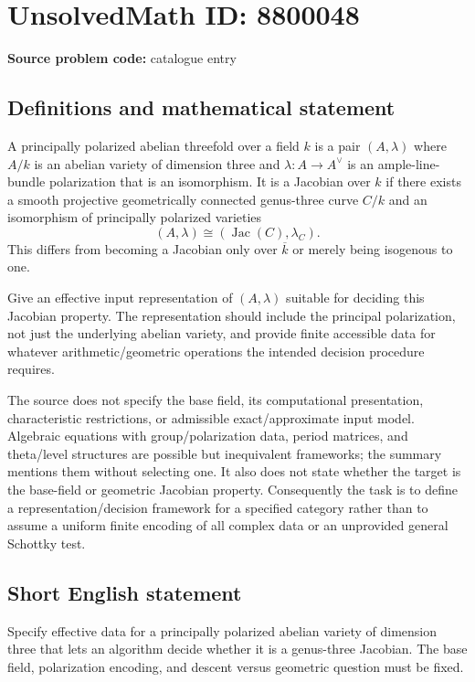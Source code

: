 \documentclass[11pt]{article}
\begin{document}
\section*{UnsolvedMath ID: 8800048}
\textbf{Source problem code:} catalogue entry
\subsection{Definitions and mathematical statement}
A principally polarized abelian threefold over a field $k$ is a pair $(A,\lambda)$ where $A/k$ is an abelian variety of dimension three and $\lambda:A\to A^\vee$ is an ample-line-bundle polarization that is an isomorphism. It is a Jacobian over $k$ if there exists a smooth projective geometrically connected genus-three curve $C/k$ and an isomorphism of principally polarized varieties
\[
(A,\lambda)\cong(\operatorname{Jac}(C),\lambda_C).
\]
This differs from becoming a Jacobian only over $\overline k$ or merely being isogenous to one.

Give an effective input representation of $(A,\lambda)$ suitable for deciding this Jacobian property. The representation should include the principal polarization, not just the underlying abelian variety, and provide finite accessible data for whatever arithmetic/geometric operations the intended decision procedure requires.

The source does not specify the base field, its computational presentation, characteristic restrictions, or admissible exact/approximate input model. Algebraic equations with group/polarization data, period matrices, and theta/level structures are possible but inequivalent frameworks; the summary mentions them without selecting one. It also does not state whether the target is the base-field or geometric Jacobian property. Consequently the task is to define a representation/decision framework for a specified category rather than to assume a uniform finite encoding of all complex data or an unprovided general Schottky test.
\subsection{Short English statement}
Specify effective data for a principally polarized abelian variety of dimension three that lets an algorithm decide whether it is a genus-three Jacobian. The base field, polarization encoding, and descent versus geometric question must be fixed.
\end{document}
